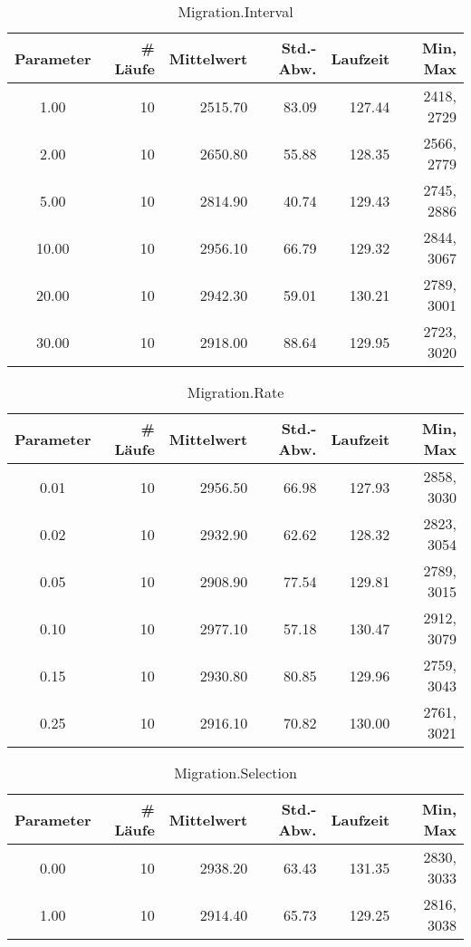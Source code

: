 \begin{table}[tbp]
\begin{tabular}{ | c || r | r | r | r | r | }
\hline
Parameter & \# Läufe & Mittelwert & Std.-Abw. & Laufzeit & Min, Max \\
\hline
   1.00 &  10 & 2515.70 &   83.09 &  127.44 & 2418, 2729 \\
   2.00 &  10 & 2650.80 &   55.88 &  128.35 & 2566, 2779 \\
   5.00 &  10 & 2814.90 &   40.74 &  129.43 & 2745, 2886 \\
  10.00 &  10 & 2956.10 &   66.79 &  129.32 & 2844, 3067 \\
  20.00 &  10 & 2942.30 &   59.01 &  130.21 & 2789, 3001 \\
  30.00 &  10 & 2918.00 &   88.64 &  129.95 & 2723, 3020 \\
\hline
\end{tabular}
\caption{Migration.Interval}\label{Migration.Interval}
\end{table}


\begin{table}[tbp]
\begin{tabular}{ | c || r | r | r | r | r | }
\hline
Parameter & \# Läufe & Mittelwert & Std.-Abw. & Laufzeit & Min, Max \\
\hline
   0.01 &  10 & 2956.50 &   66.98 &  127.93 & 2858, 3030 \\
   0.02 &  10 & 2932.90 &   62.62 &  128.32 & 2823, 3054 \\
   0.05 &  10 & 2908.90 &   77.54 &  129.81 & 2789, 3015 \\
   0.10 &  10 & 2977.10 &   57.18 &  130.47 & 2912, 3079 \\
   0.15 &  10 & 2930.80 &   80.85 &  129.96 & 2759, 3043 \\
   0.25 &  10 & 2916.10 &   70.82 &  130.00 & 2761, 3021 \\
\hline
\end{tabular}
\caption{Migration.Rate}\label{Migration.Rate}
\end{table}


\begin{table}[tbp]
\begin{tabular}{ | c || r | r | r | r | r | }
\hline
Parameter & \# Läufe & Mittelwert & Std.-Abw. & Laufzeit & Min, Max \\
\hline
   0.00 &  10 & 2938.20 &   63.43 &  131.35 & 2830, 3033 \\
   1.00 &  10 & 2914.40 &   65.73 &  129.25 & 2816, 3038 \\
\hline
\end{tabular}
\caption{Migration.Selection}\label{Migration.Selection}
\end{table}


